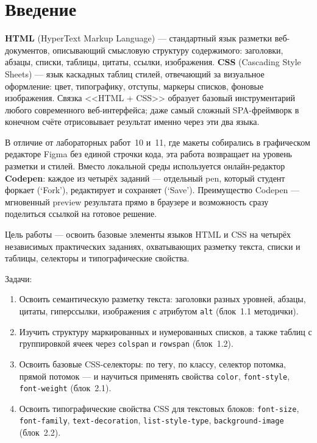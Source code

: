 \chapter*{Введение}
\label{ch:intro}

\textbf{HTML} (HyperText Markup Language) — стандартный язык разметки
веб-документов, описывающий смысловую структуру содержимого: заголовки,
абзацы, списки, таблицы, цитаты, ссылки, изображения. \textbf{CSS}
(Cascading Style Sheets) — язык каскадных таблиц стилей, отвечающий за
визуальное оформление: цвет, типографику, отступы, маркеры списков,
фоновые изображения. Связка <<HTML + CSS>> образует базовый
инструментарий любого современного веб-интерфейса; даже самый сложный
SPA-фреймворк в конечном счёте отрисовывает результат именно через эти
два языка.

В отличие от лабораторных работ~10 и~11, где макеты собирались в
графическом редакторе Figma без единой строчки кода, эта работа
возвращает на уровень разметки и стилей. Вместо локальной среды
используется онлайн-редактор \textbf{Codepen}: каждое из четырёх
заданий — отдельный pen, который студент форкает (`Fork'),
редактирует и сохраняет (`Save'). Преимущество Codepen — мгновенный
preview результата прямо в браузере и возможность сразу поделиться
ссылкой на готовое решение.

Цель работы — освоить базовые элементы языков HTML и CSS на четырёх
независимых практических заданиях, охватывающих разметку текста,
списки и таблицы, селекторы и типографические свойства.

Задачи:
\begin{enumerate}
  \item Освоить семантическую разметку текста: заголовки разных
        уровней, абзацы, цитаты, гиперссылки, изображения с
        атрибутом \texttt{alt} (блок~1.1 методички).
  \item Изучить структуру маркированных и нумерованных списков, а
        также таблиц с группировкой ячеек через \texttt{colspan}
        и \texttt{rowspan} (блок~1.2).
  \item Освоить базовые CSS-селекторы: по тегу, по классу, селектор
        потомка, прямой потомок --- и научиться применять
        свойства \texttt{color}, \texttt{font-style},
        \texttt{font-weight} (блок~2.1).
  \item Освоить типографические свойства CSS для текстовых блоков:
        \texttt{font-size}, \texttt{font-family},
        \texttt{text-decoration}, \texttt{list-style-type},
        \texttt{background-image} (блок~2.2).
\end{enumerate}

